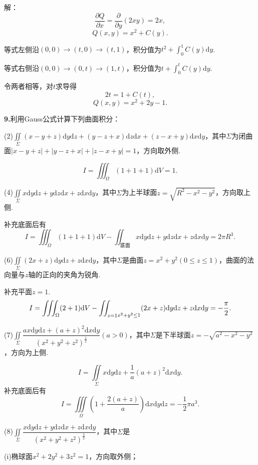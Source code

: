 \documentclass[12pt, a4paper]{article}
\newcommand{\dif}{\mathrm{d}}
\begin{document}
解：
\[\frac{\partial Q}{\partial x} = \frac{\partial}{\partial y}(2xy) = 2x,\]
\[Q(x, y) = x^2 + C(y).\]

等式左侧沿\((0, 0) \to (t, 0) \to (t, 1)\)，积分值为\(t^2 + \int_0^1 C(y) \dif y\).

等式右侧沿\((0, 0) \to (0, t) \to (1, t)\)，积分值为\(t + \int_0^t C(y) \dif y\).

令两者相等，对\(t\)求导得
\[2t = 1 + C(t),\]
\[Q(x, y) = x^2 + 2y - 1.\]

\textbf{9.}利用Gauss公式计算下列曲面积分：

(2)\(\iint\limits_\Sigma (x - y + z) \dif y \dif z + (y - z + x) \dif z \dif x + (z - x + y) \dif x \dif y\)，其中\(\Sigma\)为闭曲面\(|x - y + z| + |y - z + x| + |z - x + y| = 1\)，方向取外侧.

\[I = \iiint_\Omega (1 + 1 + 1) \dif V = 1.\]

(4)\(\iint\limits_\Sigma x \dif y \dif z + y \dif z \dif x + z \dif x \dif y\)，其中\(\Sigma\)为上半球面\(z = \sqrt{R^2 - x^2 - y^2}\)，方向取上侧.

补充底面后有
\[I = \iiint_\Omega (1 + 1 + 1) \dif V - \iint_{\text{底面}} x \dif y \dif z + y \dif z \dif x + z \dif x \dif y = 2\pi R^3.\]

(6)\(\iint\limits_\Sigma (2x + z) \dif y \dif z + z \dif x \dif y\)，其中\(\Sigma\)是曲面\(z = x^2 + y^2(0 \leq z \leq 1)\)，曲面的法向量与\(z\)轴的正向的夹角为锐角.

补充平面\(z = 1\).
\[I = \iiint_\Omega (2 + 1) \dif V - \iint_{\substack{z = 1} \\ x^2 + y^2 \leq 1} (2x + z) \dif y \dif z + z \dif x \dif y = -\frac{\pi}{2}.\]

(7)\(\iint\limits_\Sigma \dfrac{ax \dif y \dif z + (a + z)^2 \dif x \dif y}{(x^2 + y^2 + z^2)^{\frac{1}{2}}}(a > 0)\)，其中\(\Sigma\)是下半球面\(z = -\sqrt{a^2 - x^2 - y^2}\)，方向为上侧.

\[I = \iint\limits_\Sigma x \dif y \dif z + \frac{1}{a}(a + z)^2 \dif x \dif y.\]
补充底面后有
\[I = \iiint\limits_\Omega \left(1 + \frac{2(a + z)}{a}\right) \dif x \dif y \dif z = -\frac{1}{2}\pi a^3.\]

(8)\(\iint\limits_\Sigma \dfrac{x \dif y \dif z + y \dif z \dif x + z \dif x \dif y}{(x^2 + y^2 + z^2)^{\frac{3}{2}}}\)，其中\(\Sigma\)是

(i)椭球面\(x^2 + 2y^2 + 3z^2 = 1\)，方向取外侧；
\end{document}

